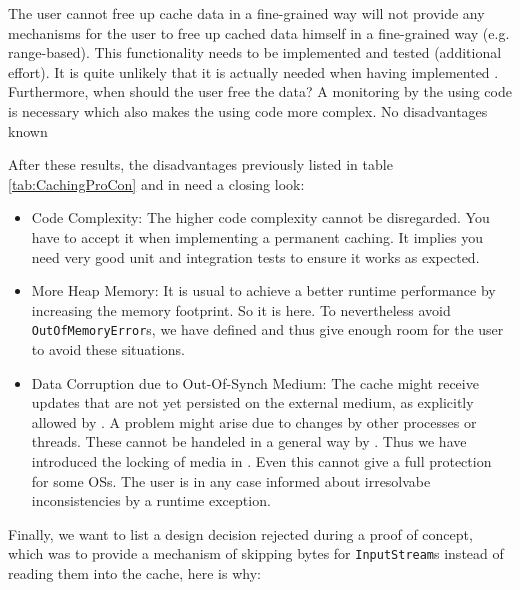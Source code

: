 {%
The user cannot free up cache data in a fine-grained way
}
{%
\COMPmedia{} will not provide any mechanisms for the user to free up cached data himself in a fine-grained way (e.g. range-based).
}
{%
This functionality needs to be implemented and tested (additional effort). It is quite unlikely that it is actually needed when having implemented . Furthermore, when should the user free the data? A monitoring by the using code is necessary which also makes the using code more complex.
}
{%
No disadvantages known
}

After these results, the disadvantages previously listed in table \hyperref[tab:CachingProCon]{\ref{tab:CachingProCon}} and in  need a closing look:
\begin{itemize}
\item Code Complexity: The higher code complexity cannot be disregarded. You have to accept it when implementing a permanent caching. It implies you need very good unit and integration tests to ensure it works as expected.
\item More Heap Memory: It is usual to achieve a better runtime performance by increasing the memory footprint. So it is here. To nevertheless avoid \texttt{OutOfMemoryError}s, we have defined  and thus give enough room for the user to avoid these situations.
\item Data Corruption due to Out-Of-Synch Medium: The cache might receive updates that are not yet persisted on the external medium, as explicitly allowed by  . A problem might arise due to changes by other processes or threads. These cannot be handeled in a general way by \LibName{}. Thus we have introduced the locking of media in . Even this cannot give a full protection for some OSs. The user is in any case informed about irresolvabe inconsistencies by a runtime exception.
\end{itemize}

Finally, we want to list a design decision rejected during a proof of concept, which was to provide a mechanism of skipping bytes for \texttt{InputStream}s instead of reading them into the cache, here is why:

